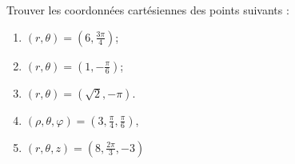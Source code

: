 
\begin{exercice}\label{exoOutilsMath-0008}

	Trouver les coordonnées cartésiennes des points suivants :
	\begin{enumerate}
		\item
			$(r,\theta)=(6,\frac{ 3\pi }{ 4 })$;
		\item
			$(r,\theta)=(1,-\frac{ \pi }{ 6 })$;
		\item
			$(r,\theta)=(\sqrt{2},-\pi)$.
		\item
			$(\rho,\theta,\varphi)=(3,\frac{ \pi }{ 4 },\frac{ \pi }{ 6 })$,
		\item
			$(r,\theta,z)=(8,\frac{ 2\pi }{ 3 },-3)$
	\end{enumerate}

\end{exercice}
